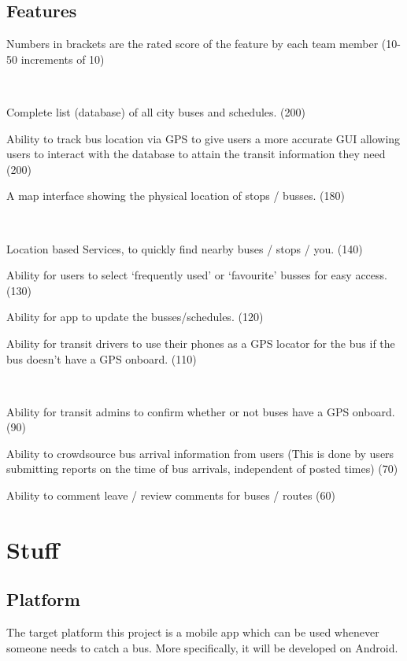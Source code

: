 \documentclass[a4paper,12pt]{article}
\begin{document}
\subsection{Features}
Numbers in brackets are the rated score of the feature by each team member (10-50 increments of 10)
\begin{description}
\item [Must haves] \hfill \
\item Complete list (database) of all city buses and schedules. (200)
\item Ability to track bus location via GPS to give users a more accurate GUI allowing users to interact with the database to attain the transit information they need (200)
\item A map interface showing the physical location of stops / busses. (180)
\item [Should Haves] \hfill \
\item Location based Services, to quickly find nearby buses / stops / you. (140)
\item Ability for users to select ‘frequently used’ or ‘favourite’ busses for easy access. (130)
\item Ability for app to update the busses/schedules. (120)
\item Ability for transit drivers to use their phones as a GPS locator for the bus if the bus doesn’t have a GPS onboard. (110)
\item [Would Be Nice] \hfill \
\item Ability for transit admins to confirm whether or not buses have a GPS onboard. (90) 
\item Ability to crowdsource bus arrival information from users (This is done by users submitting reports on the time of bus arrivals, independent of posted times) (70)
\item Ability to comment leave / review comments for buses / routes (60)
\end{description}


\pagebreak
\section{Stuff}
\subsection{Platform} 
	The target platform this project is a mobile app which can be used whenever someone needs to catch a bus. More specifically, it will be developed on Android.
\end{document}
